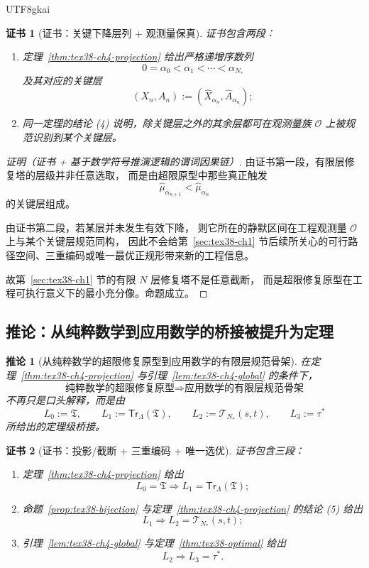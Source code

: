 \documentclass[12pt]{article}
\newtheorem{corollary}{推论}[section]
\newtheorem{Certificate}{证书}[section]
\begin{document}
\begin{CJK*}{UTF8}{gkai}
\begin{Certificate}[证书：关键下降层列 + 观测量保真]
\label{cert:tex38-ch4-source}
证书包含两段：
\begin{enumerate}
  \item 定理~\ref{thm:tex38-ch4-projection} 给出严格递增序数列
  \[
    0=\alpha_0<\alpha_1<\cdots<\alpha_{N_\ast}
  \]
  及其对应的关键层
  \[
    (X_n,A_n):=(\widehat X_{\alpha_n},\widehat A_{\alpha_n});
  \]
  \item 同一定理的结论 (4) 说明，除关键层之外的其余层都可在观测量族 $\mathcal O$ 上被规范识别到某个关键层。
\end{enumerate}
\end{Certificate}

\begin{proof}[证明（证书 + 基于数学符号推演逻辑的谓词因果链）]
由证书第一段，有限层修复塔的层级并非任意选取，
而是由超限原型中那些真正触发
\[
  \widehat\mu_{\alpha_{n+1}}<\widehat\mu_{\alpha_n}
\]
的关键层组成。

由证书第二段，若某层并未发生有效下降，
则它所在的静默区间在工程观测量 $\mathcal O$ 上与某个关键层规范同构，
因此不会给第~\ref{sec:tex38-ch1} 节后续所关心的可行路径空间、三重编码或唯一最优正规形带来新的工程信息。

故第~\ref{sec:tex38-ch1} 节的有限 $N$ 层修复塔不是任意截断，
而是超限修复原型在工程可执行意义下的最小充分像。命题成立。
\end{proof}

\subsection{推论：从纯粹数学到应用数学的桥接被提升为定理}
\label{subsec:tex38-ch4-corollary}

\begin{corollary}[从纯粹数学的超限修复原型到应用数学的有限层规范骨架]
\label{cor:tex38-ch4-bridge}
在定理~\ref{thm:tex38-ch4-projection} 与引理~\ref{lem:tex38-ch4-global} 的条件下，
\[
  \text{纯粹数学的超限修复原型}
  \Longrightarrow
  \text{应用数学的有限层规范骨架}
\]
不再只是口头解释，而是由
\[
  L_0:=\mathfrak T,
  \qquad
  L_1:=\mathsf{Tr}_\Lambda(\mathfrak T),
  \qquad
  L_2:=\mathcal T_{N_\ast}(s,t),
  \qquad
  L_3:=\tau^\ast
\]
所给出的定理级桥接。
\end{corollary}

\begin{Certificate}[证书：投影/截断 + 三重编码 + 唯一选优]
\label{cert:tex38-ch4-bridge}
证书包含三段：
\begin{enumerate}
  \item 定理~\ref{thm:tex38-ch4-projection} 给出
  \[
    L_0=\mathfrak T
    \Longrightarrow
    L_1=\mathsf{Tr}_\Lambda(\mathfrak T);
  \]
  \item 命题~\ref{prop:tex38-bijection} 与定理~\ref{thm:tex38-ch4-projection} 的结论 (5) 给出
  \[
    L_1
    \Longrightarrow
    L_2=\mathcal T_{N_\ast}(s,t);
  \]
  \item 引理~\ref{lem:tex38-ch4-global} 与定理~\ref{thm:tex38-optimal} 给出
  \[
    L_2
    \Longrightarrow
    L_3=\tau^\ast.
  \]
\end{enumerate}
\end{Certificate}


\end{CJK*}
\end{document}
